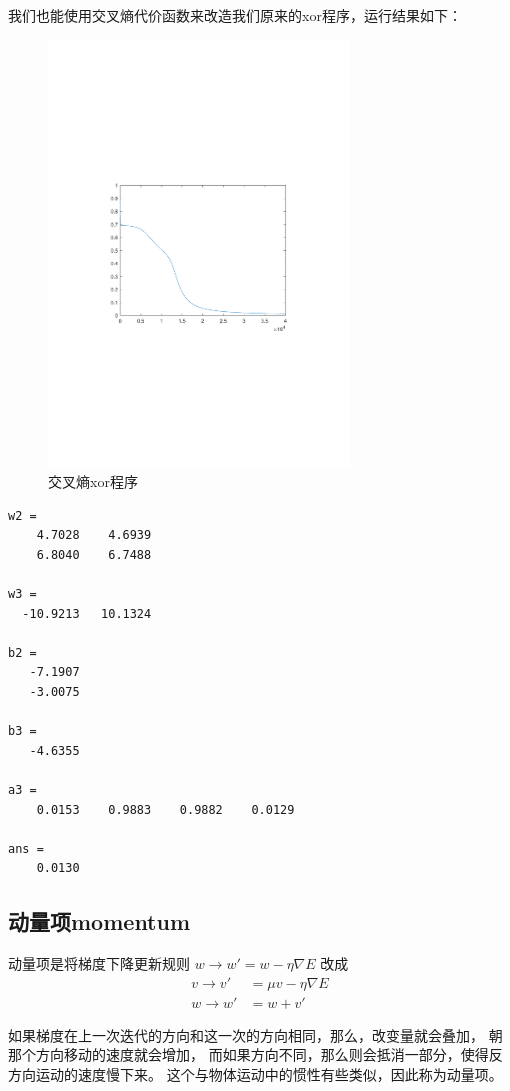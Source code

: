 我们也能使用交叉熵代价函数来改造我们原来的xor程序，运行结果如下：
\begin{figure}[H]
\centering
\includegraphics[width=8cm]{fig/xor2.pdf}
\caption{交叉熵xor程序}
\end{figure}
\newpage
\begin{lstlisting}
w2 =
    4.7028    4.6939
    6.8040    6.7488

w3 =
  -10.9213   10.1324

b2 =
   -7.1907
   -3.0075

b3 =
   -4.6355

a3 =
    0.0153    0.9883    0.9882    0.0129

ans =
    0.0130
\end{lstlisting}

\subsection{动量项momentum}
动量项是将梯度下降更新规则 $w\rightarrow w'=w-\eta\nabla E$ 改成
\begin{align} 
  v \rightarrow v' &= \mu v - \eta \nabla E \\
  w \rightarrow w' &= w+v' 
\end{align}


如果梯度在上一次迭代的方向和这一次的方向相同，那么，改变量就会叠加，
朝那个方向移动的速度就会增加，
而如果方向不同，那么则会抵消一部分，使得反方向运动的速度慢下来。
这个与物体运动中的惯性有些类似，因此称为动量项。

